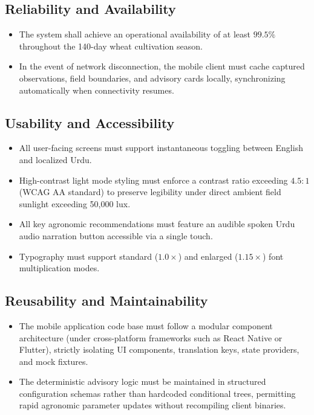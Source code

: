 \subsection{Reliability and Availability}
\begin{itemize}
    \item The system shall achieve an operational availability of at least $99.5\%$ throughout the 140-day wheat cultivation season.
    \item In the event of network disconnection, the mobile client must cache captured observations, field boundaries, and advisory cards locally, synchronizing automatically when connectivity resumes.
\end{itemize}

\subsection{Usability and Accessibility}
\begin{itemize}
    \item All user-facing screens must support instantaneous toggling between English and localized Urdu.
    \item High-contrast light mode styling must enforce a contrast ratio exceeding $4.5:1$ (WCAG AA standard) to preserve legibility under direct ambient field sunlight exceeding 50,000 lux.
    \item All key agronomic recommendations must feature an audible spoken Urdu audio narration button accessible via a single touch.
    \item Typography must support standard ($1.0\times$) and enlarged ($1.15\times$) font multiplication modes.
\end{itemize}

\subsection{Reusability and Maintainability}
\begin{itemize}
    \item The mobile application code base must follow a modular component architecture (under cross-platform frameworks such as React Native or Flutter), strictly isolating UI components, translation keys, state providers, and mock fixtures.
    \item The deterministic advisory logic must be maintained in structured configuration schemas rather than hardcoded conditional trees, permitting rapid agronomic parameter updates without recompiling client binaries.
\end{itemize}

